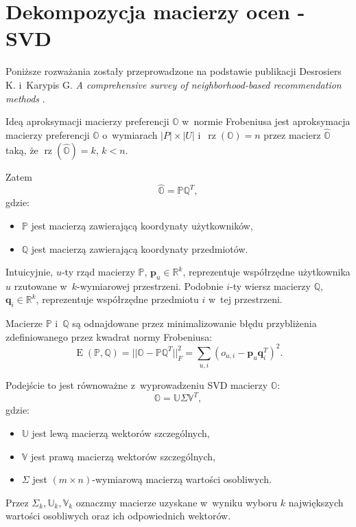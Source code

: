 \documentclass[12pt,a4paper]{report}
\newcommand{\setR}{\mathbb{R}}
\newcommand{\rz}[1]{\operatorname{rz}\left({#1} \right)}
\newcommand{\e}[1]{\operatorname{E}\left({#1} \right)}
\begin{document}
\section{Dekompozycja macierzy ocen - SVD}
Poniższe rozważania zostały przeprowadzone na podstawie publikacji Desrosiers K. i~Karypis G. \textit{A comprehensive survey of neighborhood-based recommendation methods} {\citep[Sec 4.1.1]{acsonbrs}}.

Ideą aproksymacji macierzy preferencji $\mathbb{O}$ w~normie Frobeniusa jest aproksymacja macierzy preferencji $\mathbb{O}$ o~wymiarach $|\mathit{P}| \times |\mathit{U}|$ i~$\rz{\mathbb{O}} = n$ przez macierz $\widehat{\mathbb{O}}$ taką, że $\rz{\widehat{\mathbb{O}}} = k$, $k<n$. 

Zatem
$$
\widehat{\mathbb{O}} = \mathbb{P}\mathbb{Q}^T,
$$
gdzie:
\begin{itemize}
\item $\mathbb{P}$ jest macierzą zawierającą koordynaty użytkowników,
\item $\mathbb{Q}$ jest macierzą zawierającą koordynaty przedmiotów.
\end{itemize}

Intuicyjnie, $u$-ty rząd macierzy $\mathbb{P}$, $\mathbf{p}_u \in \setR^k$, reprezentuje współrzędne użytkownika $u$ rzutowane w~$k$-wymiarowej przestrzeni. Podobnie $i$-ty wiersz macierzy $\mathbb{Q}$, $\mathbf{q}_i \in \setR^k$, reprezentuje współrzędne przedmiotu $i$ w~tej przestrzeni.

Macierze $\mathbb{P}$ i~$\mathbb{Q}$ są odnajdowane przez minimalizowanie błędu przybliżenia zdefiniowanego przez kwadrat normy Frobeniusa:
$$
\e{\mathbb{P}, \mathbb{Q}} = ||\mathbb{O}-\mathbb{P} \mathbb{Q}^T||_F^2 = \sum_{u,i}(o_{u,i} - \mathbf{p}_u\mathbf{q}_i^T)^2.
$$

Podejście to jest równoważne z~wyprowadzeniu SVD macierzy $\mathbb{O}$:
$$
\mathbb{O} = \mathbb{U} \Sigma \mathbb{V}^T,
$$
gdzie:
\begin{itemize}
\item $\mathbb{U}$ jest lewą macierzą wektorów szczególnych,
\item $\mathbb{V}$ jest prawą macierzą wektorów szczególnych,
\item $\Sigma$ jest $(m\times n)$-wymiarową macierzą wartości osobliwych.
\end{itemize}

Przez $\Sigma_k, \mathbb{U}_k, \mathbb{V}_k$ oznaczmy macierze uzyskane w~wyniku wyboru $k$ największych wartości osobliwych oraz ich odpowiednich wektorów. 
\end{document}
